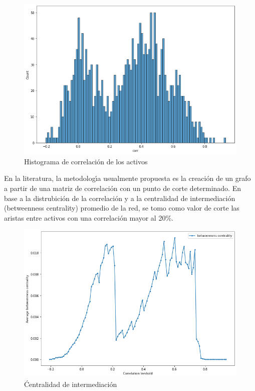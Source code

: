 \documentclass[runningheads,a4paper,10pt]{etc/llncs}
\begin{document}
\begin{figure}[htp]
    \centering
    \includegraphics[scale=0.3]{images/correlation_hist.png}
    \caption{Histograma de correlación de los activos}
    \label{fig:hist_corr}
\end{figure}

En la literatura, la metodologı́a usualmente propuesta es la creación de un grafo a partir de una matriz de correlación con un punto de corte determinado.
En base a la distrubición de la correlación y a la centralidad de intermediación (betweenness centrality) promedio de la red, se tomo como valor de corte las aristas entre activos con una correlación mayor al 20\%.

\begin{figure}[htp]
    \centering
    \includegraphics[scale=0.3]{images/betweeness_centrality.png}
    \caption{Ćentralidad de intermediación}
    \label{fig:btw_centrality}
\end{figure}
\end{document}
